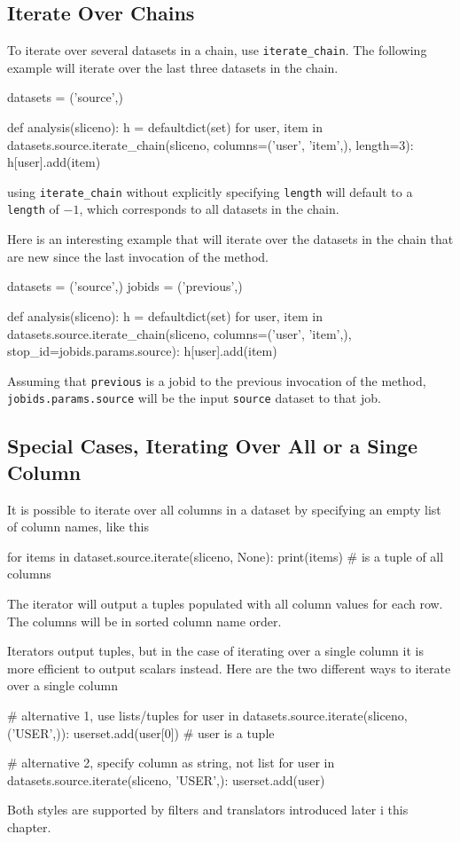 \subsection*{Iterate Over Chains}
To iterate over several datasets in a chain, use
\texttt{iterate\_chain}.  The following example will iterate over the
last three datasets in the chain.
\begin{python}
datasets = ('source',)

def analysis(sliceno):
    h = defaultdict(set)
    for user, item in datasets.source.iterate_chain(sliceno, columns=('user', 'item',), length=3):
        h[user].add(item)
\end{python}
using \texttt{iterate\_chain} without explicitly specifying
\texttt{length} will default to a \texttt{length} of $-1$, which
corresponds to all datasets in the chain.

Here is an interesting example that will iterate over the datasets in
the chain that are new since the last invocation of the method.
\begin{python}
datasets = ('source',)
jobids = ('previous',)

def analysis(sliceno):
    h = defaultdict(set)
    for user, item in datasets.source.iterate_chain(sliceno, columns=('user', 'item',), stop_id=jobids.params.source):
        h[user].add(item)
\end{python}
  Assuming that \texttt{previous} is a jobid to
the previous invocation of the method, \texttt{jobids.params.source}
will be the input \texttt{source} dataset to that job.  



\subsection*{Special Cases, Iterating Over All or a Singe Column}
It is possible to iterate over all columns in a dataset by specifying
an empty list of column names, like this
\begin{python}
for items in dataset.source.iterate(sliceno, None):
    print(items)  # is a tuple of all columns
\end{python}
The iterator will output a tuples populated with all column values for
each row.  The columns will be in sorted column name order.

Iterators output tuples, but in the case of iterating over a single
column it is more efficient to output scalars instead.  Here are the
two different ways to iterate over a single column
\begin{python}
# alternative 1, use lists/tuples
for user in datasets.source.iterate(sliceno, ('USER',)):
    userset.add(user[0])  # user is a tuple

# alternative 2, specify column as string, not list
for user in datasets.source.iterate(sliceno, 'USER',):
    userset.add(user)
\end{python}
Both styles are supported by filters and translators introduced later
i this chapter.




